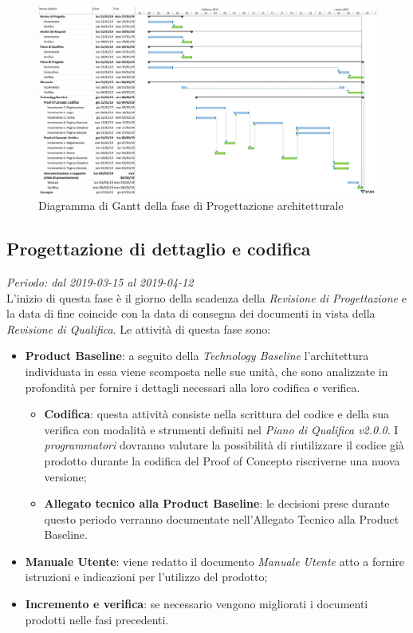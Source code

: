 \begin{figure}[H]
	\includegraphics[width=0.99\linewidth]{res/images/gantt_pa.jpg}
	\caption{Diagramma di Gantt della fase di Progettazione architetturale}
\end{figure}


\subsection{Progettazione di dettaglio e codifica}
\textit{Periodo: dal 2019-03-15 al 2019-04-12} \\
L'inizio di questa fase è il giorno della scadenza della \textit{Revisione di 
Progettazione} e la data di fine coincide con la data di consegna dei documenti 
in vista della \textit{Revisione di Qualifica}. Le attività di questa fase sono:
\begin{itemize}
	\item \textbf{Product Baseline}: a seguito della \textit{Technology 
	Baseline} l'architettura individuata in essa viene scomposta nelle sue unità,
	che sono analizzate in profondità per fornire i dettagli necessari alla loro codifica e verifica. 
	\begin{itemize}
		\item \textbf{Codifica}: questa attività consiste nella scrittura del 
		codice e della sua verifica con modalità e strumenti definiti nel 
		\textit{Piano di Qualifica v2.0.0}. I \textit{programmatori} dovranno valutare la possibilità di riutilizzare il codice già prodotto durante la codifica del Proof of Concept\glosp o riscriverne una nuova versione;
		\item \textbf{Allegato tecnico alla Product Baseline}: le decisioni prese durante questo periodo verranno documentate nell'Allegato Tecnico alla Product Baseline.
	\end{itemize}
	\item \textbf{Manuale Utente}: viene redatto il documento \textit{Manuale 
	Utente} atto a fornire istruzioni e indicazioni per l'utilizzo del prodotto;
	\item \textbf{Incremento e verifica}: se necessario vengono migliorati i 
	documenti prodotti nelle fasi precedenti.
\end{itemize}

